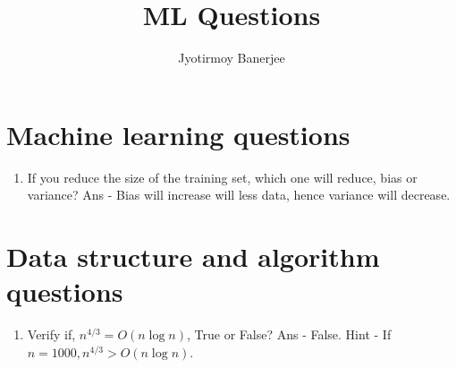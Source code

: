 \documentclass{article}
\title{ML Questions}
\author{Jyotirmoy Banerjee}
\begin{document}
\maketitle

\section{Machine learning questions}

\begin{enumerate}
\item If you reduce the size of the training set, which one will reduce, bias or variance? Ans - Bias will increase will less data, hence variance will decrease.
\end{enumerate}

\section{Data structure and algorithm questions}

\begin{enumerate}
\item Verify if, $n^{4/3} = O(n \log n)$, True or False? Ans - False. Hint - If $n = 1000, n^{4/3} > O(n \log n)$.
\end{enumerate}
\end{document}
